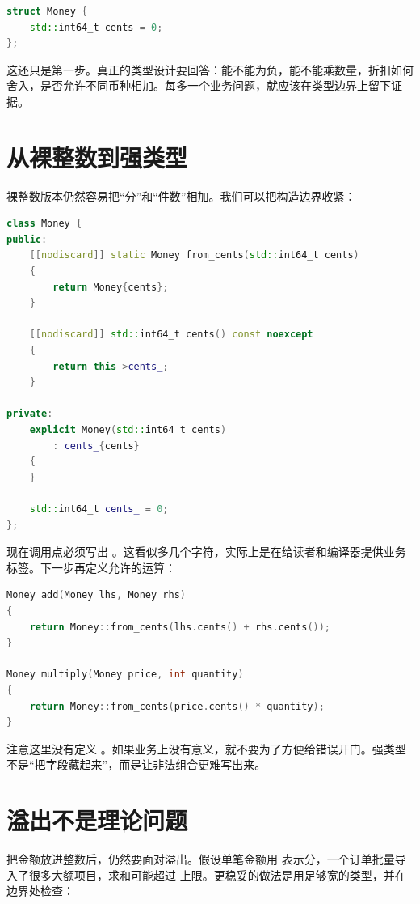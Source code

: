 \begin{lstlisting}[language=C++,caption={金额以最小单位入账}]
struct Money {
    std::int64_t cents = 0;
};
\end{lstlisting}

这还只是第一步。真正的类型设计要回答：能不能为负，能不能乘数量，折扣如何舍入，是否允许不同币种相加。每多一个业务问题，就应该在类型边界上留下证据。

\section{从裸整数到强类型}

裸整数版本仍然容易把“分”和“件数”相加。我们可以把构造边界收紧：

\begin{lstlisting}[language=C++,caption={用工厂函数建立金额}]
class Money {
public:
    [[nodiscard]] static Money from_cents(std::int64_t cents)
    {
        return Money{cents};
    }

    [[nodiscard]] std::int64_t cents() const noexcept
    {
        return this->cents_;
    }

private:
    explicit Money(std::int64_t cents)
        : cents_{cents}
    {
    }

    std::int64_t cents_ = 0;
};
\end{lstlisting}

现在调用点必须写出 。这看似多几个字符，实际上是在给读者和编译器提供业务标签。下一步再定义允许的运算：

\begin{lstlisting}[language=C++,caption={只开放有意义的金额运算}]
Money add(Money lhs, Money rhs)
{
    return Money::from_cents(lhs.cents() + rhs.cents());
}

Money multiply(Money price, int quantity)
{
    return Money::from_cents(price.cents() * quantity);
}
\end{lstlisting}

注意这里没有定义 。如果业务上没有意义，就不要为了方便给错误开门。强类型不是“把字段藏起来”，而是让非法组合更难写出来。

\section{溢出不是理论问题}

把金额放进整数后，仍然要面对溢出。假设单笔金额用  表示分，一个订单批量导入了很多大额项目，求和可能超过  上限。更稳妥的做法是用足够宽的类型，并在边界处检查：

